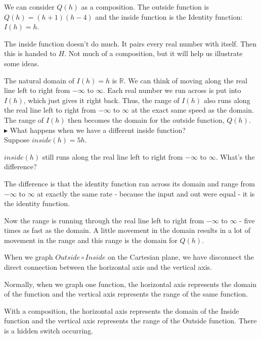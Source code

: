 \documentclass{ximera}
\begin{document}
We can consider $Q(h)$ as a composition.  The outside function is $Q(h) = (h+1)(h-4)$ and the inside function is the Identity function: $I(h)=h$.  

The inside function doesn't do much.  It pairs every real number with itself.  Then this is handed to $H$. Not much of a composition, but it will help us illustrate some ideas.



The natural domain of $I(h)=h$ is \textbf{$\mathbb{R}$}.  We can think of moving along the real line left to right from $-\infty$ to $\infty$.  Each real number we run across is put into $I(h)$, which just gives it right back.  Thus, the range of $I(h)$ also runs along the real line left to right from $-\infty$ to $\infty$ at the exact same speed as the domain.  The range of $I(h)$ then becomes the domain for the outside function, $Q(h)$. \\



$\blacktriangleright$  What happens when we have a different inside function? \\


Suppose $inside(h) = 5h$.


$inside(h)$ still runs along the real line left to right from $-\infty$ to $\infty$. What's the difference?

The difference is that the identity function ran across its domain and range from $-\infty$ to $\infty$ at exactly the same rate - because the input and out were equal - it is the identity function.


Now the range is running through the real line left to right from $-\infty$ to $\infty$ - five times as fast as the domain. A little movement in the domain results in a lot of movement in the range and this range is the domain for $Q(h)$.






\begin{paradox}

When we graph $Outside \circ Inside$ on the Cartesian plane, we have disconnect the direct connection between the horizontal axis and the vertical axis.

Normally, when we graph one function, the horizontal axis represents the domain of the function and the vertical axis represents the range of the same function.

With a composition, the horizontal axis represents the domain of the Inside function and the vertical axis represents the range of the Outside function.  There is a hidden switch occurring.

\end{paradox}
\end{document}
